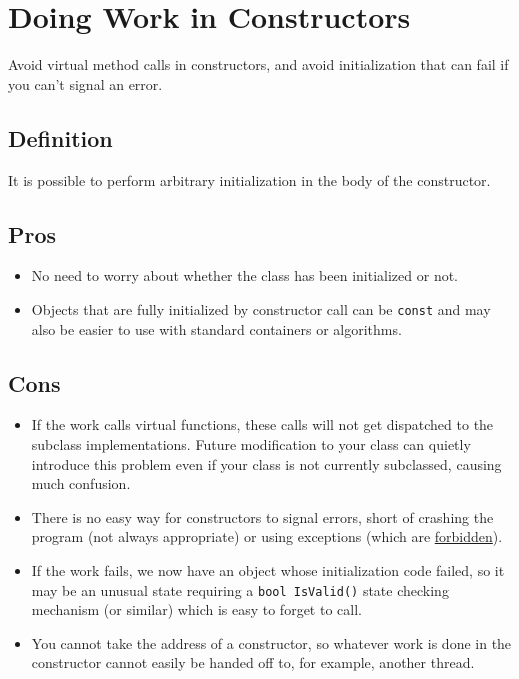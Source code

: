 
\section{Doing Work in Constructors}\label{sec:doing-work-in-constructors}
Avoid virtual method calls in constructors, and avoid initialization that can fail if you can't signal an error.

\subsection{Definition}
It is possible to perform arbitrary initialization in the body of the constructor.

\subsection{Pros}
\begin{itemize}
    \item No need to worry about whether the class has been initialized or not.
    \item Objects that are fully initialized by constructor call can be \texttt{const} and may also be easier to use with standard containers or algorithms.
\end{itemize}

\subsection{Cons}
\begin{itemize}
    \item If the work calls virtual functions, these calls will not get dispatched to the subclass implementations. Future modification to your class can quietly introduce this problem even if your class is not currently subclassed, causing much confusion.
    \item There is no easy way for constructors to signal errors, short of crashing the program (not always appropriate) or using exceptions (which are \hyperref[sec:exceptions]{forbidden}).
    \item If the work fails, we now have an object whose initialization code failed, so it may be an unusual state requiring a \texttt{bool IsValid()} state checking mechanism (or similar) which is easy to forget to call.
    \item You cannot take the address of a constructor, so whatever work is done in the constructor cannot easily be handed off to, for example, another thread.
\end{itemize}

